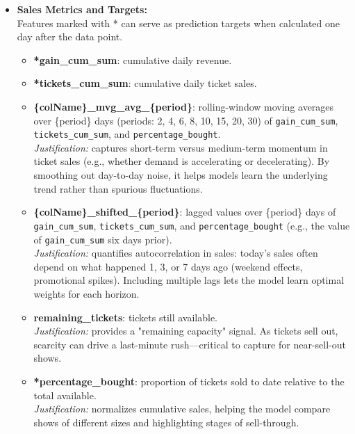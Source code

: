 \documentclass[a4paper,12pt]{report}  %
\begin{document}
    \begin{itemize}
      \item \textbf{Sales Metrics and Targets:}\\
        Features marked with * can serve as prediction targets when calculated one day after the data point.
        \begin{itemize}
          \item \textbf{*gain\_cum\_sum}: cumulative daily revenue.
          \item \textbf{*tickets\_cum\_sum}: cumulative daily ticket sales.
          \item \textbf{\{colName\}\_mvg\_avg\_\{period\}}: rolling-window moving averages over \{period\} days (periods: 2, 4, 6, 8, 10, 15, 20, 30) of \texttt{gain\_cum\_sum}, \texttt{tickets\_cum\_sum}, and \texttt{percentage\_bought}.  \\
            \emph{Justification:} captures short-term versus medium-term momentum in ticket sales (e.g., whether demand is accelerating or decelerating). By smoothing out day-to-day noise, it helps models learn the underlying trend rather than spurious fluctuations.
          \item \textbf{\{colName\}\_shifted\_\{period\}}: lagged values over \{period\} days of \texttt{gain\_cum\_sum}, \texttt{tickets\_cum\_sum}, and \texttt{percentage\_bought} (e.g., the value of \texttt{gain\_cum\_sum} six days prior).  \\
            \emph{Justification:} quantifies autocorrelation in sales: today's sales often depend on what happened 1, 3, or 7 days ago (weekend effects, promotional spikes). Including multiple lags lets the model learn optimal weights for each horizon.
          \item \textbf{remaining\_tickets}: tickets still available.  \\
            \emph{Justification:} provides a "remaining capacity" signal. As tickets sell out, scarcity can drive a last-minute rush—critical to capture for near-sell-out shows.
          \item \textbf{*percentage\_bought}: proportion of tickets sold to date relative to the total available.  \\
            \emph{Justification:} normalizes cumulative sales, helping the model compare shows of different sizes and highlighting stages of sell-through.
        \end{itemize}


\end{itemize}
\end{document}

